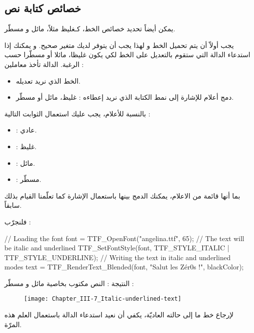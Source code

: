 \subsection{خصائص كتابة نص}

يمكن أيضاً تحديد خصائص الخط، كـغليظ مثلاً، مائل و مسطّر. 

يجب أولاّ أن يتم تحميل الخط و لهذا يجب أن يتوفر لديك متغير
صحيح. و يمكنك إذا استدعاء الدالة 
التي ستقوم بالتعديل على الخط لكي يكون غليظا، مائلا أو مسطّرا حسب الرغبة. الدالة تأخذ معاملين :

\begin{itemize}
	\item الخط الذي نريد تعديله.
	\item دمج أعلام للإشارة إلى نمط الكتابة الذي نريد إعطاءه : غليظ، مائل أو مسطّر.
\end{itemize}

بالنسبة للأعلام، يجب عليك استعمال الثوابت التالية :

\begin{itemize}
	\item {} :
	عادي.
	\item {} :
	غليظ.
	\item {} :
	مائل.
	\item {} :
	مسطّر.
\end{itemize}

بما أنها قائمة من الاعلام، يمكنك الدمج بينها باستعمال الإشارة
\InlineCode{|}
كما تعلّمنا القيام بذلك سابقاً.

فلنجرّب :

\begin{Csource}
// Loading the font
font = TTF_OpenFont("angelina.ttf", 65);
// The text will be italic and underlined
TTF_SetFontStyle(font, TTF_STYLE_ITALIC | TTF_STYLE_UNDERLINE);
// Writing the text in italic and underlined modes
text = TTF_RenderText_Blended(font, "Salut les Zér0s !", blackColor);
\end{Csource}

النتيجة : النص مكتوب بخاصية مائل و مسطّر :

\begin{figure}[H]
	\centering
	\texttt{[image: Chapter\_III-7\_Italic-underlined-text]}
\end{figure}

لإرجاع خط ما إلى حالته العاديّة، يكفي أن نعيد استدعاء الدالة
باستعمال العلم
هذه المرّة.

